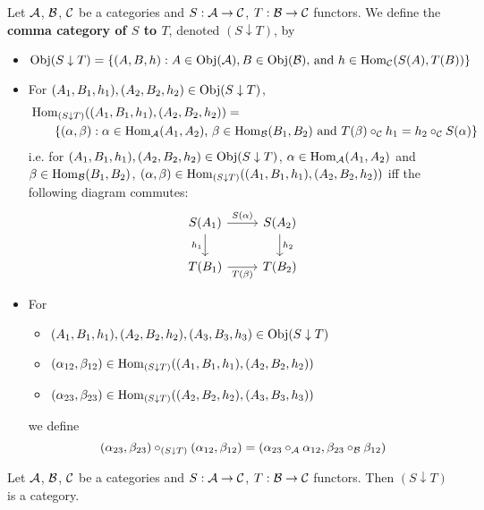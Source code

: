 \documentclass{book}
\begin{document}
	
	\begin{defn} 
		Let $\mathcal{A}$, $\mathcal{B}$, $\mathcal{C}$ be a categories and $S: \mathcal{A} \rightarrow \mathcal{C}$, $T: \mathcal{B} \rightarrow \mathcal{C}$ functors. We define the \textbf{comma category of $S$ to $T$}, denoted $(S \downarrow T)$, by 
		\begin{itemize}
			\item $\operatorname{Obj}(S \downarrow T) = \{(A, B, h): A \in \operatorname{Obj}(\mathcal{A}), B \in \operatorname{Obj}(\mathcal{B}) \text{, and } h \in \operatorname{Hom}_{\mathcal{C}}(S(A), T(B))\}$
			\item For $(A_1, B_1, h_1), (A_2, B_2, h_2) \in \operatorname{Obj}(S \downarrow T)$, 
			\begin{align*}
				& \operatorname{Hom}_{(S \downarrow T)}((A_1, B_1, h_1), (A_2, B_2, h_2)) = \\
				& \quad \quad \{(\alpha, \beta): \alpha \in \operatorname{Hom}_{\mathcal{A}}(A_1, A_2) \text{, } \beta \in \operatorname{Hom}_{\mathcal{B}}(B_1, B_2) \text{ and } T(\beta) \circ_{\mathcal{C}} h_1 = h_2 \circ_{\mathcal{C}} S(\alpha)\}
			\end{align*}
			i.e. for $(A_1, B_1, h_1), (A_2, B_2, h_2) \in \operatorname{Obj}(S \downarrow T)$, $\alpha \in \operatorname{Hom}_{\mathcal{A}}(A_1, A_2)$ and $\beta \in \operatorname{Hom}_{\mathcal{B}}(B_1, B_2)$, $(\alpha, \beta) \in \operatorname{Hom}_{(S \downarrow T)}((A_1, B_1, h_1), (A_2, B_2, h_2))$ iff the following diagram commutes:
			\[ 
			\begin{tikzcd}
				S(A_1) \arrow[r, "S(\al)"] \arrow[d, "h_1"'] & S(A_2)  \arrow[d, "h_2"] \\
				T(B_1) \arrow[r, "T(\be)"']                 & T(B_2)
			\end{tikzcd}
			\]
			\item For 
			\begin{itemize}
				\item $(A_1, B_1, h_1), (A_2, B_2, h_2), (A_3, B_3, h_3) \in \operatorname{Obj}(S \downarrow T)$
				\item $(\alpha_{12}, \beta_{12}) \in \operatorname{Hom}_{(S \downarrow T)}((A_1, B_1, h_1), (A_2, B_2, h_2))$
				\item $(\alpha_{23}, \beta_{23}) \in \operatorname{Hom}_{(S \downarrow T)}((A_2, B_2, h_2), (A_3, B_3, h_3))$
			\end{itemize}
			we define 
			$$(\alpha_{23}, \beta_{23}) \circ_{(S \downarrow T)} (\alpha_{12}, \beta_{12}) = (\alpha_{23} \circ_{\mathcal{A}} \alpha_{12}, \beta_{23} \circ_{\mathcal{B}} \beta_{12})$$
		\end{itemize}
	\end{defn}
	
	\begin{ex} 
		Let $\mathcal{A}$, $\mathcal{B}$, $\mathcal{C}$ be a categories and $S: \mathcal{A} \rightarrow \mathcal{C}$, $T: \mathcal{B} \rightarrow \mathcal{C}$ functors. Then $(S \downarrow T)$ is a category.
	\end{ex}
	
\end{document}
